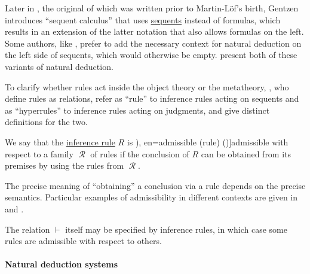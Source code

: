 \begin{remark}
  Later in \cite{Gentzen1964LogicalDeduction}, the original of which was written prior to Martin-L\"of's birth, Gentzen introduces \enquote{sequent calculus} that uses \hyperref[def:sequent]{sequents} instead of formulas, which results in an extension of the latter notation that also allows formulas on the left. Some authors, like , prefer to add the necessary context for natural deduction on the left side of sequents, which would otherwise be empty.  present both of these variants of natural deduction.

  To clarify whether rules act inside the object theory or the metatheory, , who define rules as relations, refer as \enquote{rule} to inference rules acting on sequents and as \enquote{hyperrules} to inference rules acting on judgments, and give distinct definitions for the two.
\end{remark}

\begin{concept}\label{con:inference_rule_admissibility}\mimprovised
  We say that the \hyperref[def:inference_rule]{inference rule} \( R \) is \term[ru=допустимое (правило) (\cite[252]{Герасимов2011Вычислимость}), en=admissible (rule) (\cite[76]{TroelstraSchwichtenberg2000Proofs})]{admissible} with respect to a family \( \mscrR \) of rules if the conclusion of \( R \) can be obtained from its premises by using the rules from \( \mscrR \).
\end{concept}
\begin{comments}
  \item The precise meaning of \enquote{obtaining} a conclusion via a rule depends on the precise semantics. Particular examples of admissibility in different contexts are given in  and .

  \item The relation \( {\vdash} \) itself may be specified by inference rules, in which case some rules are admissible with respect to others.
\end{comments}

\paragraph{Natural deduction systems}

